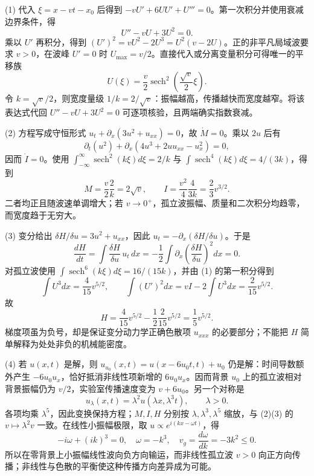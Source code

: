 (1) 代入 \(\xi=x-vt-x_0\) 后得到 \(-vU'+6UU'+U'''=0\)。第一次积分并使用衰减边界条件，得
\[
U''-vU+3U^2=0.
\]
乘以 \(U'\) 再积分，得到 \((U')^2=vU^2-2U^3=U^2(v-2U)\)。正的非平凡局域波要求 \(v>0\)，在波峰 \(U'=0\) 时 \(U_{\max}=v/2\)。直接代入或分离变量积分可得唯一的平移族
\[
\boxed{U(\xi)=\frac v2\operatorname{sech}^2\!\left(\frac{\sqrt v}{2}\xi\right)}.
\]
令 \(k=\sqrt v/2\)，则宽度量级 \(1/k=2/\sqrt v\)：振幅越高，传播越快而宽度越窄。将该表达式代回 \(U''-vU+3U^2=0\) 可逐项核验，且两端确实指数衰减。

(2) 方程写成守恒形式 \(u_t+\partial_x(3u^2+u_{xx})=0\)，故 \(\dot M=0\)。乘以 \(2u\) 后有
\[
\partial_t(u^2)+\partial_x(4u^3+2uu_{xx}-u_x^2)=0,
\]
因而 \(\dot I=0\)。使用 \(\int_{-\infty}^{\infty}\operatorname{sech}^2(k\xi)d\xi=2/k\) 与 \(\int\operatorname{sech}^4(k\xi)d\xi=4/(3k)\)，得到
\[
\boxed{M=\frac v2\frac2k=2\sqrt v},\qquad
\boxed{I=\frac{v^2}{4}\frac4{3k}=\frac23v^{3/2}}.
\]
二者均正且随波速单调增大；若 \(v\to0^+\)，孤立波振幅、质量和二次积分均趋零，而宽度趋于无穷大。

(3) 变分给出 \(\delta H/\delta u=3u^2+u_{xx}\)，因此 \(u_t=-\partial_x(\delta H/\delta u)\)。于是
\[
\frac{dH}{dt}=\int\frac{\delta H}{\delta u}\,u_t\,dx
=-\frac12\int\partial_x\!\left(\frac{\delta H}{\delta u}\right)^2dx=0.
\]
对孤立波使用 \(\int\operatorname{sech}^6(k\xi)d\xi=16/(15k)\)，并由 (1) 的第一积分得到
\[
\int U^3dx=\frac4{15}v^{5/2},\qquad
\int(U')^2dx=vI-2\int U^3dx=\frac2{15}v^{5/2}.
\]
故
\[
\boxed{H=\frac4{15}v^{5/2}-\frac12\frac2{15}v^{5/2}=\frac15v^{5/2}}.
\]
梯度项虽为负号，却是保证变分动力学正确色散项 \(u_{xxx}\) 的必要部分；不能把 \(H\) 简单解释为处处非负的机械能密度。

(4) 若 \(u(x,t)\) 是解，则 \(u_{u_0}(x,t)=u(x-6u_0t,t)+u_0\) 仍是解：时间导数额外产生 \(-6u_0u_x\)，恰好抵消非线性项新增的 \(6u_0u_x\)。因而背景 \(u_0\) 上的孤立波相对背景振幅仍为 \(v/2\)，实验室传播速度变为 \(v+6u_0\)。另一个对称是
\[
u_\lambda(x,t)=\lambda^2u(\lambda x,\lambda^3t),\qquad\lambda>0.
\]
各项均乘 \(\lambda^5\)，因此变换保持方程；\(M,I,H\) 分别按 \(\lambda,\lambda^3,\lambda^5\) 缩放，与 (2)(3) 的 \(v\mapsto\lambda^2v\) 一致。在线性小振幅极限，取 \(u\propto e^{i(kx-\omega t)}\)，得
\[
-i\omega+(ik)^3=0,\quad \boxed{\omega=-k^3},\quad
\boxed{v_g=\frac{d\omega}{dk}=-3k^2\le0}.
\]
所以在零背景上小振幅线性波向负方向输运，而非线性孤立波 \(v>0\) 向正方向传播；非线性与色散的平衡使这种传播方向差异成为可能。
